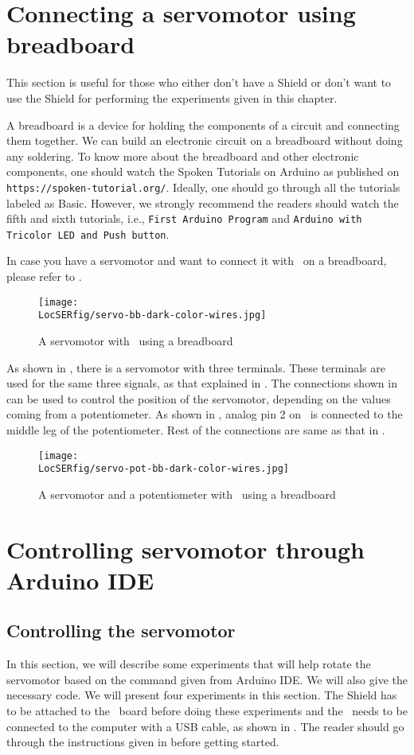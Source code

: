 \section{Connecting a servomotor using breadboard}
This section is useful for those who either don't have a Shield or don't want to use the Shield
for performing the experiments given in this chapter.

A breadboard is a device for holding the components of a circuit and connecting 
them together. We can build an electronic circuit on a breadboard without doing any 
soldering. To know more about the breadboard and other electronic components, 
one should watch the Spoken Tutorials on Arduino as published on
  {\tt https://spoken-tutorial.org/}. Ideally, one should go through all the
tutorials labeled as Basic. However, we strongly recommend the readers should
watch the fifth and sixth tutorials, i.e., {\tt First Arduino Program} and 
  {\tt Arduino with Tricolor LED and Push button}.

In case you have a servomotor and want to connect it with \arduino\ on a breadboard, 
please refer to . 
\begin{figure}
  \centering
  \texttt{[image: \\LocSERfig/servo-bb-dark-color-wires.jpg]}
  \caption{A servomotor with \arduino\ using a breadboard}
  \label{fig:servo-bread}
\end{figure}
As shown in , there is a servomotor with three 
terminals. These terminals are used for the same three signals, as that explained 
in . The connections shown in  can 
be used to control the position of the servomotor, depending on the 
values coming from a potentiometer. As shown in , 
analog pin 2 on \arduino\ is connected to the middle leg of the 
potentiometer. Rest of the connections are same as that in . 

\begin{figure}
  \centering
  \texttt{[image: \\LocSERfig/servo-pot-bb-dark-color-wires.jpg]}
  \caption{A servomotor and a potentiometer with \arduino\ using a breadboard}
  \label{fig:servo-pot-bread}
\end{figure}

\section{Controlling servomotor through Arduino IDE}
\subsection{Controlling the servomotor}
\label{sec:servo-ard}
In this section, we will describe some experiments that will help
rotate the servomotor based on the command given from Arduino IDE.  We
will also give the necessary code.  We will present four experiments
in this section.  The Shield has to be attached to the \arduino\ board
before doing these experiments and the \arduino\ needs to be connected to the computer 
with a USB cable, as shown in . The reader should go through the
instructions given in  before getting started.


